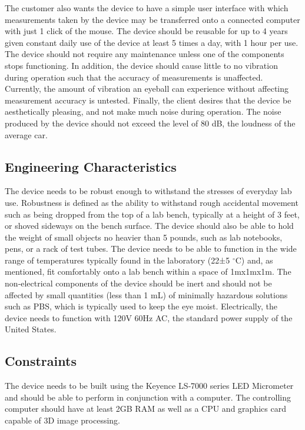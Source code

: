 \documentclass{article}
\begin{document}
The customer also wants the device to have a simple user interface with which measurements taken by the device may be transferred onto a connected computer with just 1 click of the mouse. The device should  be reusable for up to 4 years given constant daily use of the device at least 5 times a day, with 1 hour per use\cite{keyence01}. The device should not require any maintenance unless one of the components stops functioning\cite{keyence01}. In addition, the device should cause little to no vibration during operation such that the accuracy of measurements is unaffected. Currently, the amount of vibration an eyeball can experience without affecting measurement accuracy is untested. Finally, the client desires that the device be aesthetically pleasing, and not make much noise during operation. The noise produced by the device should not exceed the level of 80 dB, the loudness of the average car\cite{truax09}.  

\subsection{Engineering Characteristics}
The device needs to be robust enough to withstand the stresses of everyday lab use. Robustness is defined as the ability to withstand rough accidental movement such as being dropped from the top of a lab bench, typically at a height of 3 feet, or shoved sideways on the bench surface. The device should also be able to hold the weight of small objects no heavier than 5 pounds, such as lab notebooks, pens, or a rack of test tubes. The device needs to be able to function in the wide range of temperatures typically found in the laboratory (22±5 $^\circ$C) and, as mentioned, fit comfortably onto a lab bench within a space of 1mx1mx1m. The non‐electrical components of the device should be inert and should not be affected by small quantities (less than 1 mL) of minimally hazardous solutions such as PBS\cite{users_manual}, which is typically used to keep the eye moist. Electrically, the device needs to function with 120V 60Hz AC, the standard power supply of the United States.

\subsection{Constraints}
The device needs to be built using the Keyence LS‐7000 series LED Micrometer and should be able to perform in conjunction with a computer. The controlling computer should have at least 2GB RAM as well as a CPU and graphics card capable of 3D image processing.
\end{document}
